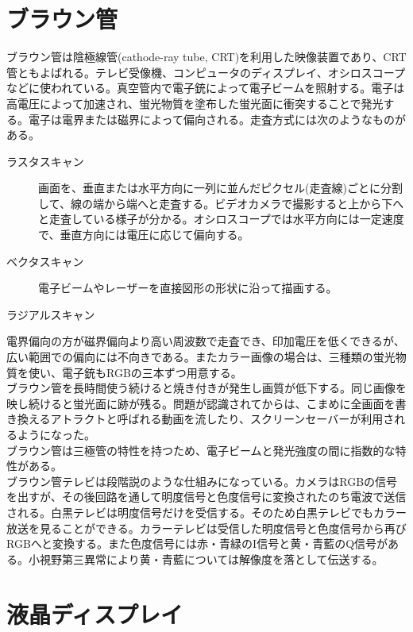 	\section{ブラウン管}
		ブラウン管は陰極線管(cathode-ray tube, CRT)を利用した映像装置であり、CRT管ともよばれる。テレビ受像機、コンピュータのディスプレイ、オシロスコープなどに使われている。真空管内で電子銃によって電子ビームを照射する。電子は高電圧によって加速され、蛍光物質を塗布した蛍光面に衝突することで発光する。電子は電界または磁界によって偏向される。走査方式には次のようなものがある。
		\begin{description}
			\item[ラスタスキャン] 画面を、垂直または水平方向に一列に並んだピクセル(走査線)ごとに分割して、線の端から端へと走査する。ビデオカメラで撮影すると上から下へと走査している様子が分かる。オシロスコープでは水平方向には一定速度で、垂直方向には電圧に応じて偏向する。
			\item[ベクタスキャン] 電子ビームやレーザーを直接図形の形状に沿って描画する。
			\item[ラジアルスキャン]
		\end{description}
		電界偏向の方が磁界偏向より高い周波数で走査でき、印加電圧を低くできるが、広い範囲での偏向には不向きである。またカラー画像の場合は、三種類の蛍光物質を使い、電子銃もRGBの三本ずつ用意する。\\
		ブラウン管を長時間使う続けると焼き付きが発生し画質が低下する。同じ画像を映し続けると蛍光面に跡が残る。問題が認識されてからは、こまめに全画面を書き換えるアトラクトと呼ばれる動画を流したり、スクリーンセーバーが利用されるようになった。\\
		ブラウン管は三極管の特性を持つため、電子ビームと発光強度の間に指数的な特性がある。\\
		ブラウン管テレビは段階説のような仕組みになっている。カメラはRGBの信号を出すが、その後回路を通して明度信号と色度信号に変換されたのち電波で送信される。白黒テレビは明度信号だけを受信する。そのため白黒テレビでもカラー放送を見ることができる。カラーテレビは受信した明度信号と色度信号から再びRGBへと変換する。また色度信号には赤・青緑のI信号と黄・青藍のQ信号がある。小視野第三異常により黄・青藍については解像度を落として伝送する。
	\section{液晶ディスプレイ}